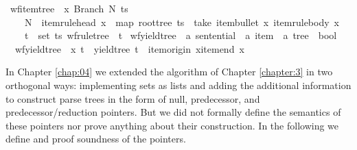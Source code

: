 \begin{isabellebody}
{\isacharbar}{\kern0pt}\ {\isachardoublequoteopen}wf{\isacharunderscore}{\kern0pt}item{\isacharunderscore}{\kern0pt}tree\ {\isasymG}\ x\ {\isacharparenleft}{\kern0pt}Branch\ N\ ts{\isacharparenright}{\kern0pt}\ {\isasymlongleftrightarrow}\ {\isacharparenleft}{\kern0pt}\isanewline
\ \ \ \ N\ {\isacharequal}{\kern0pt}\ item{\isacharunderscore}{\kern0pt}rule{\isacharunderscore}{\kern0pt}head\ x\ {\isasymand}\ map\ root{\isacharunderscore}{\kern0pt}tree\ ts\ {\isacharequal}{\kern0pt}\ take\ {\isacharparenleft}{\kern0pt}item{\isacharunderscore}{\kern0pt}bullet\ x{\isacharparenright}{\kern0pt}\ {\isacharparenleft}{\kern0pt}item{\isacharunderscore}{\kern0pt}rule{\isacharunderscore}{\kern0pt}body\ x{\isacharparenright}{\kern0pt}\ {\isasymand}\isanewline
\ \ \ \ {\isacharparenleft}{\kern0pt}{\isasymforall}t\ {\isasymin}\ set\ ts{\isachardot}{\kern0pt}\ wf{\isacharunderscore}{\kern0pt}rule{\isacharunderscore}{\kern0pt}tree\ {\isasymG}\ t{\isacharparenright}{\kern0pt}{\isacharparenright}{\kern0pt}{\isachardoublequoteclose}\isanewline
\isanewline
{}\isamarkupfalse%
\ wf{\isacharunderscore}{\kern0pt}yield{\isacharunderscore}{\kern0pt}tree\ {\isacharcolon}{\kern0pt}{\isacharcolon}{\kern0pt}\ {\isachardoublequoteopen}{\isacharprime}{\kern0pt}a\ sentential\ {\isasymRightarrow}\ {\isacharprime}{\kern0pt}a\ item\ {\isasymRightarrow}\ {\isacharprime}{\kern0pt}a\ tree\ {\isasymRightarrow}\ bool{\isachardoublequoteclose}\ \isanewline
\ \ {\isachardoublequoteopen}wf{\isacharunderscore}{\kern0pt}yield{\isacharunderscore}{\kern0pt}tree\ {\isasymomega}\ x\ t\ {\isasymequiv}\ yield{\isacharunderscore}{\kern0pt}tree\ t\ {\isacharequal}{\kern0pt}\ {\isasymomega}{\isacharbrackleft}{\kern0pt}item{\isacharunderscore}{\kern0pt}origin\ x{\isachardot}{\kern0pt}{\isachardot}{\kern0pt}item{\isacharunderscore}{\kern0pt}end\ x{\isasymrangle}{\isachardoublequoteclose}%
\isadelimdocument
%
\endisadelimdocument
%
\isatagdocument
%
\isamarkuptrue%
%
\endisatagdocument
{\isafolddocument}%
%
\isadelimdocument
%
\endisadelimdocument
%
\begin{isamarkuptext}%
In Chapter \ref{chap:04} we extended the algorithm of Chapter \ref{chapter:3} in two orthogonal
ways: implementing sets as lists and adding the additional information to construct parse trees
in the form of null, predecessor, and predecessor/reduction pointers. But we did not formally define
the semantics of these pointers nor prove anything about their construction. In the following we
define and proof soundness of the pointers.


\end{isamarkuptext}
\end{isabellebody}
